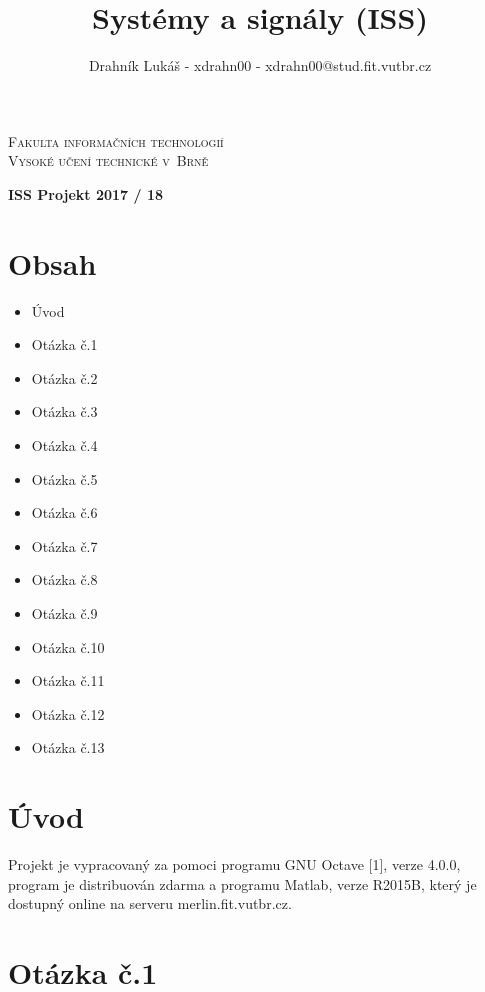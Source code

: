 \documentclass[a4paper,11pt]{article}
\begin{document}
\begin{center}
\textsc{\Huge Fakulta informačních technologií\\
Vysoké učení technické v~Brně\\}

\LARGE \title{Systémy a signály (ISS)\\}
\textbf{ISS Projekt 2017 / 18\\}

\hfill \author{Drahník Lukáš - xdrahn00 - xdrahn00@stud.fit.vutbr.cz}
\end{center}

{\let\newpage\relax\maketitle}

\newpage

\section*{Obsah}
\begin{itemize}
  \item Úvod
  \item Otázka č.1
  \item Otázka č.2
  \item Otázka č.3
  \item Otázka č.4
  \item Otázka č.5
  \item Otázka č.6
  \item Otázka č.7
  \item Otázka č.8
  \item Otázka č.9
  \item Otázka č.10
  \item Otázka č.11
  \item Otázka č.12
  \item Otázka č.13
\end{itemize}

\newpage

\section{Úvod}
Projekt je vypracovaný za pomoci programu GNU Octave [1], verze 4.0.0, program je distribuován zdarma a programu Matlab, verze R2015B, který je dostupný online na serveru merlin.fit.vutbr.cz.

\newpage

\section{Otázka č.1}
\end{document}
